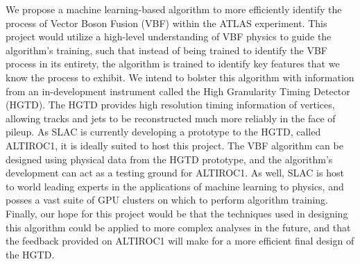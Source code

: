 \documentclass[paper=a4,fontsize=12pt]{article}
\begin{document}
We propose a machine learning-based algorithm to more efficiently identify the process of Vector Boson Fusion (VBF) within the ATLAS experiment. This project would utilize a high-level understanding of VBF physics to guide the algorithm's training, such that instead of being trained to identify the VBF process in its entirety, the algorithm is trained to identify key features that we know the process to exhibit. We intend to bolster this algorithm with information from an in-development instrument called the High Granularity Timing Detector (HGTD). The HGTD provides high resolution timing information of vertices, allowing tracks and jets to be reconstructed much more reliably in the face of pileup. As SLAC is currently developing a prototype to the HGTD, called ALTIROC1, it is ideally suited to host this project. The VBF algorithm can be designed using physical data from the HGTD prototype, and the algorithm's development can act as a testing ground for ALTIROC1. As well, SLAC is host to world leading experts in the applications of machine learning to physics, and posses a vast suite of GPU clusters on which to perform algorithm training. Finally, our hope for this project would be that the techniques used in designing this algorithm could be applied to more complex analyses in the future, and that the feedback provided on ALTIROC1 will make for a more efficient final design of the HGTD.
\end{document}
